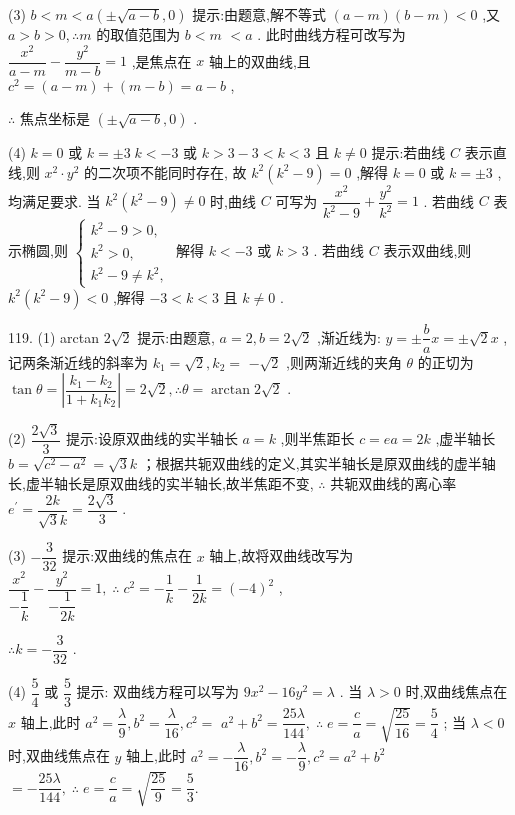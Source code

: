 (3) $b < m < a\left( {\pm \sqrt{a - b},0}\right)$ 提示:由题意,解不等式 $\left( {a - m}\right) \left( {b - m}\right)  < 0$ ,又 $a > b > 0,\therefore m$ 的取值范围为 $b < m$  $< a$ . 此时曲线方程可改写为 $\dfrac{{x}^{2}}{a - m} - \dfrac{{y}^{2}}{m - b} = 1$ ,是焦点在 $x$ 轴上的双曲线,且 ${c}^{2} = \left( {a - m}\right)  + \left( {m - b}\right)  = a - b$ ,

$\therefore$ 焦点坐标是 $\left( {\pm \sqrt{a - b},0}\right)$ .

(4) $k = 0$ 或 $k =  \pm  3\;k <  - 3$ 或 $k > 3 - 3 < k < 3$ 且 $k \neq  0$ 提示:若曲线 $C$ 表示直线,则 ${x}^{2} \cdot  {y}^{2}$ 的二次项不能同时存在, 故 ${k}^{2}\left( {{k}^{2} - 9}\right)  = 0$ ,解得 $k = 0$ 或 $k =  \pm  3$ ,均满足要求. 当 ${k}^{2}\left( {{k}^{2} - 9}\right)  \neq  0$ 时,曲线 $C$ 可写为 $\dfrac{{x}^{2}}{{k}^{2} - 9} + \dfrac{{y}^{2}}{{k}^{2}} = 1$ . 若曲线 $C$ 表示椭圆,则 $\left\{  \begin{array}{l} {k}^{2} - 9 > 0, \\  {k}^{2} > 0, \\  {k}^{2} - 9 \neq  {k}^{2}, \end{array}\right.$ 解得 $k <  - 3$ 或 $k > 3$ . 若曲线 $C$ 表示双曲线,则 ${k}^{2}\left( {{k}^{2} - 9}\right)  < 0$ ,解得 $- 3 < k < 3$ 且 $k \neq  0$ .

119. (1) arctan $2\sqrt{2}$ 提示:由题意, $a = 2,b = 2\sqrt{2}$ ,渐近线为: $y =  \pm  \dfrac{b}{a}x =  \pm  \sqrt{2}x$ ,记两条渐近线的斜率为 ${k}_{1} = \sqrt{2},{k}_{2} =$  $- \sqrt{2}$ ,则两渐近线的夹角 $\theta$ 的正切为 $\tan \theta  = \left| \dfrac{{k}_{1} - {k}_{2}}{1 + {k}_{1}{k}_{2}}\right|  = 2\sqrt{2},\therefore \theta  = \arctan 2\sqrt{2}$ .

(2) $\dfrac{2\sqrt{3}}{3}$ 提示:设原双曲线的实半轴长 $a = k$ ,则半焦距长 $c = {ea} = {2k}$ ,虚半轴长 $b = \sqrt{{c}^{2} - {a}^{2}} = \sqrt{3}k$ ；根据共轭双曲线的定义,其实半轴长是原双曲线的虚半轴长,虚半轴长是原双曲线的实半轴长,故半焦距不变, $\therefore$ 共轭双曲线的离心率 ${e}^{\prime } = \dfrac{2k}{\sqrt{3}k} = \dfrac{2\sqrt{3}}{3}$ .

(3) $- \dfrac{3}{32}$ 提示:双曲线的焦点在 $x$ 轴上,故将双曲线改写为 $\dfrac{{x}^{2}}{-\dfrac{1}{k}} - \dfrac{{y}^{2}}{-\dfrac{1}{2k}} = 1,\;\therefore \;{c}^{2} =  - \dfrac{1}{k} - \dfrac{1}{2k} = {\left( -4\right) }^{2}$ ,

$\therefore k =  - \dfrac{3}{32}$ .

(4) $\dfrac{5}{4}$ 或 $\dfrac{5}{3}$ 提示: 双曲线方程可以写为 $9{x}^{2} - {16}{y}^{2} = \lambda$ . 当 $\lambda  > 0$ 时,双曲线焦点在 $x$ 轴上,此时 ${a}^{2} = \dfrac{\lambda }{9},{b}^{2} = \dfrac{\lambda }{16},{c}^{2} =$  ${a}^{2} + {b}^{2} = \dfrac{25\lambda }{144},\;\therefore \;e = \dfrac{c}{a} = \sqrt{\dfrac{25}{16}} = \dfrac{5}{4}$ ; 当 $\lambda  < 0$ 时,双曲线焦点在 $y$ 轴上,此时 ${a}^{2} =  - \dfrac{\lambda }{16},{b}^{2} =  - \dfrac{\lambda }{9},{c}^{2} = {a}^{2} + {b}^{2}$  $=  - \dfrac{25\lambda }{144},\;\therefore \;e = \dfrac{c}{a} = \sqrt{\dfrac{25}{9}} = \dfrac{5}{3}.$

